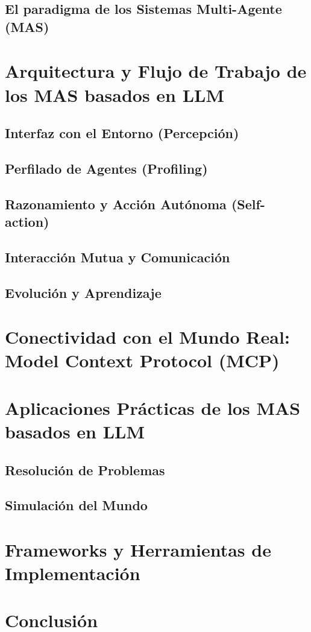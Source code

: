 \documentclass[12pt,a4paper]{article}
\begin{document}
\subsection{El paradigma de los Sistemas Multi-Agente (MAS)}

\section{Arquitectura y Flujo de Trabajo de los MAS basados en LLM}

\subsection{Interfaz con el Entorno (Percepción)}

\subsection{Perfilado de Agentes (Profiling)}

\subsection{Razonamiento y Acción Autónoma (Self-action)}

\subsection{Interacción Mutua y Comunicación}

\subsection{Evolución y Aprendizaje}

\section{Conectividad con el Mundo Real: Model Context Protocol (MCP)}

\section{Aplicaciones Prácticas de los MAS basados en LLM}

\subsection{Resolución de Problemas}

\subsection{Simulación del Mundo}

\section{Frameworks y Herramientas de Implementación}

\section{Conclusión}
\end{document}
